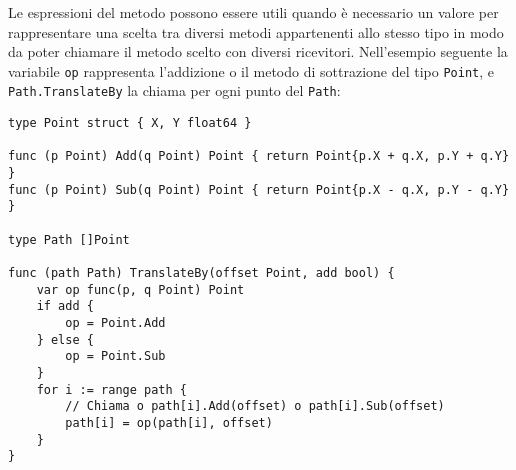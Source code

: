 \documentclass[../../thesis.tex]{subfiles}
\begin{document}
    Le espressioni del metodo possono essere utili quando è necessario un valore per rappresentare una scelta tra diversi metodi appartenenti allo stesso tipo in modo da poter chiamare il metodo scelto con diversi ricevitori.
    Nell'esempio seguente la variabile \verb"op" rappresenta l'addizione o il metodo di sottrazione del tipo \verb"Point", e \verb"Path.TranslateBy" la chiama per ogni punto del \verb"Path":
    \begin{lstlisting}[frame = single,label={lst:lstlisting5-4.5}]
type Point struct { X, Y float64 }

func (p Point) Add(q Point) Point { return Point{p.X + q.X, p.Y + q.Y} }
func (p Point) Sub(q Point) Point { return Point{p.X - q.X, p.Y - q.Y} }

type Path []Point

func (path Path) TranslateBy(offset Point, add bool) {
    var op func(p, q Point) Point
    if add {
        op = Point.Add
    } else {
        op = Point.Sub
    }
    for i := range path {
        // Chiama o path[i].Add(offset) o path[i].Sub(offset)
        path[i] = op(path[i], offset)
    }
}
    \end{lstlisting}
\end{document}
